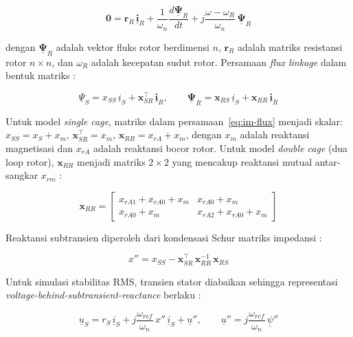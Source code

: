 \begin{equation}
  \mathbf{0} = \mathbf{r}_R\,\underline{\mathbf{i}}_R
    + \frac{1}{\omega_n}\frac{d\underline{\boldsymbol{\Psi}}_R}{dt}
    + j\frac{\omega - \omega_R}{\omega_n}\,\underline{\boldsymbol{\Psi}}_R
  \label{eq:im-ur-cage}
\end{equation}

dengan $\underline{\boldsymbol{\Psi}}_R$ adalah vektor fluks rotor berdimensi $n$,
$\mathbf{r}_R$ adalah matriks resistansi rotor $n \times n$, dan $\omega_R$ adalah
kecepatan sudut rotor. Persamaan \textit{flux linkage} dalam bentuk matriks
\cite{digsilent2024asm}:

\begin{equation}
  \underline{\Psi}_S = x_{SS}\,\underline{i}_S + \mathbf{x}_{SR}^\top\,\underline{\mathbf{i}}_R,
  \qquad
  \underline{\boldsymbol{\Psi}}_R = \mathbf{x}_{RS}\,\underline{i}_S
    + \mathbf{x}_{RR}\,\underline{\mathbf{i}}_R
  \label{eq:im-flux}
\end{equation}

Untuk model \textit{single cage}, matriks dalam persamaan~\eqref{eq:im-flux} menjadi
skalar: $x_{SS} = x_S + x_m$, $\mathbf{x}_{SR}^\top = x_m$,
$\mathbf{x}_{RR} = x_{rA} + x_m$, dengan $x_m$ adalah reaktansi magnetisasi dan
$x_{rA}$ adalah reaktansi bocor rotor. Untuk model \textit{double cage} (dua loop
rotor), $\mathbf{x}_{RR}$ menjadi matriks $2 \times 2$ yang mencakup reaktansi mutual
antar-sangkar $x_{rm}$ \cite{digsilent2024asm}:

\begin{equation}
  \mathbf{x}_{RR} = \begin{bmatrix}
    x_{rA1} + x_{rA0} + x_m & x_{rA0} + x_m \\
    x_{rA0} + x_m & x_{rA2} + x_{rA0} + x_m
  \end{bmatrix}
  \label{eq:im-xrr-double}
\end{equation}

Reaktansi subtransien diperoleh dari kondensasi Schur matriks impedansi
\cite{digsilent2024asm}:

\begin{equation}
  x'' = x_{SS} - \mathbf{x}_{SR}^\top\,\mathbf{x}_{RR}^{-1}\,\mathbf{x}_{RS}
  \label{eq:im-xpp}
\end{equation}

Untuk simulasi stabilitas RMS, transien stator diabaikan sehingga representasi
\textit{voltage-behind-subtransient-reactance} berlaku \cite{digsilent2024asm}:

\begin{equation}
  \underline{u}_S = r_S\,\underline{i}_S + j\frac{\omega_{ref}}{\omega_n}\,x''\,\underline{i}_S
    + \underline{u}'', \qquad
  \underline{u}'' = j\frac{\omega_{ref}}{\omega_n}\,\underline{\psi}''
  \label{eq:im-rms}
\end{equation}

